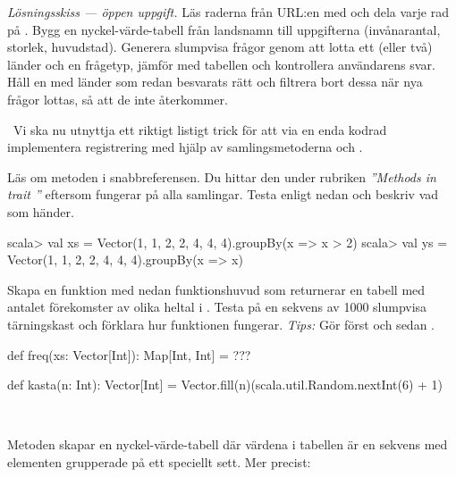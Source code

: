 \TaskSolved \what
\emph{Lösningsskiss --- öppen uppgift.} Läs raderna från URL:en med  och dela varje rad på . Bygg en nyckel-värde-tabell  från landsnamn till uppgifterna (invånarantal, storlek, huvudstad). Generera slumpvisa frågor genom att lotta ett (eller två) länder och en frågetyp, jämför med tabellen och kontrollera användarens svar. Håll en  med länder som redan besvarats rätt och filtrera bort dessa när nya frågor lottas, så att de inte återkommer.

\QUESTEND



\AdvancedTasks %



\QUESTBEGIN

\Task \what~Vi ska nu utnyttja ett riktigt listigt trick för att via en enda kodrad implementera registrering med hjälp av samlingsmetoderna  och .

\Subtask Läs om metoden  i snabbreferensen. Du hittar den under rubriken \emph{''Methods in trait ''} eftersom  fungerar på alla samlingar. Testa  enligt nedan och beskriv vad som händer.

\begin{REPL}
scala> val xs = Vector(1, 1, 2, 2, 4, 4, 4).groupBy(x => x > 2)
scala> val ys = Vector(1, 1, 2, 2, 4, 4, 4).groupBy(x => x)
\end{REPL}

\Subtask Skapa en funktion  med nedan funktionshuvud som returnerar en tabell med antalet förekomster av olika heltal i . Testa  på en sekvens av 1000 slumpvisa tärningskast och förklara hur funktionen  fungerar. \emph{Tips:} Gör först  och sedan .

\begin{Code}
def freq(xs: Vector[Int]): Map[Int, Int] = ???

def kasta(n: Int): Vector[Int] =
  Vector.fill(n)(scala.util.Random.nextInt(6) + 1)
\end{Code}

\SOLUTION

\TaskSolved \what~

\SubtaskSolved Metoden  skapar en nyckel-värde-tabell där värdena i tabellen är en sekvens med elementen grupperade på ett speciellt sett.
Mer precist:

